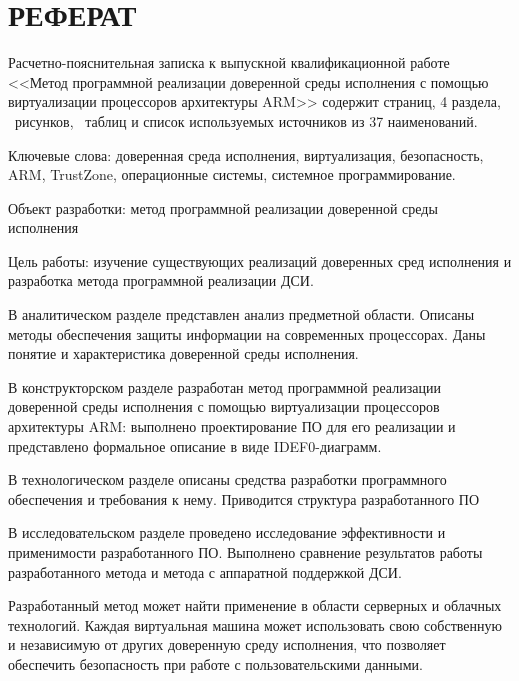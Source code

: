 \section*{РЕФЕРАТ}

Расчетно-пояснительная записка к выпускной квалификационной работе <<Метод программной реализации доверенной среды исполнения с помощью виртуализации процессоров архитектуры ARM>> содержит \pageref{LastPage} страниц, 4 раздела, \totalfigures\ рисунков, \totaltables\ таблиц и список используемых источников из 37 наименований.

Ключевые слова: доверенная среда исполнения, виртуализация, безопасность, ARM, 
TrustZone, операционные системы, системное программирование.

Объект разработки: метод программной реализации доверенной среды исполнения

Цель работы: изучение существующих реализаций доверенных сред исполнения и разработка метода программной реализации ДСИ.
 
В аналитическом разделе представлен анализ предметной области. Описаны методы обеспечения защиты информации на современных процессорах. Даны понятие и характеристика доверенной среды исполнения.

В конструкторском разделе разработан метод программной реализации доверенной среды исполнения с помощью виртуализации процессоров архитектуры ARM: выполнено проектирование ПО для его реализации и представлено формальное описание в виде IDEF0-диаграмм.

В технологическом разделе описаны средства разработки программного обеспечения и требования к нему. Приводится структура разрабо­танного ПО

В исследовательском разделе проведено исследование эффективности и применимости разработанного ПО. Выполнено сравнение результатов работы разработанного метода и метода с аппаратной поддержкой ДСИ.

Разработанный метод может найти применение в области серверных и облачных технологий. Каждая виртуальная машина может использовать свою собственную и независимую от других доверенную среду исполнения, что позволяет обеспечить безопасность при работе с пользовательскими данными.

\pagebreak
